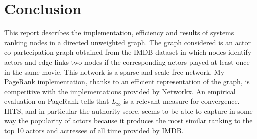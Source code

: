 \documentclass{article}
\begin{document}
\section*{Conclusion}
This report describes the implementation, efficiency and results of systems ranking nodes in a directed unweighted graph. The graph considered is an actor co-partecipation graph obtained from the IMDB dataset in which nodes identify actors and edge links two nodes if the corresponding actors played at least once in the same movie. This network is a sparse and scale free network. My PageRank implementation, thanks to an efficient representation of the graph, is competitive with the implementations provided by Networkx. An empirical evaluation on PageRank tells that \textit{L$_{\infty}$} is a relevant measure for convergence. HITS, and in particular the authority score, seems to be able to capture in some way the popularity of actors because it produces the most similar ranking to the top 10 actors and actresses of all time provided by IMDB.

{}

\end{document}
